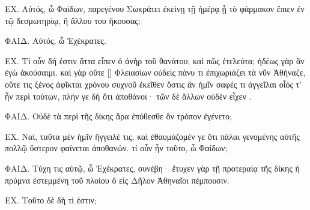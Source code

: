 \documentclass[11pt,a4paper]{book}
\begin{document}
\beginnumbering

\pstart
{}ΕΧ. Αὐτός, ὦ Φαίδων, παρεγένου Σωκράτει ἐκείνῃ τῇ ἡμέρᾳ ᾗ τὸ φάρμακον ἔπιεν ἐν τῷ δεσμωτηρίῳ, ἢ ἄλλου του ἤκουσας;

ΦΑΙΔ. Αὐτός, ὦ Ἐχέκρατες.

ΕΧ. Τί οὖν δή ἐστιν ἅττα εἶπεν ὁ ἀνὴρ  τοῦ θανάτου; καὶ πῶς ἐτελεύτα; ἡδέως γὰρ ἂν ἐγὼ ἀκούσαιμι. καὶ γὰρ οὔτε [] Φλειασίων οὐδεὶς πάνυ τι ἐπιχωριάζει τὰ νῦν Ἀθήναζε, οὔτε τις ξένος ἀφῖκται χρόνου συχνοῦ ἐκεῖθεν ὅστις ἂν ἡμῖν σαφές τι ἀγγεῖλαι οἷός τ' ἦν περὶ τούτων, πλήν γε δὴ ὅτι   ἀποθάνοι· τῶν δὲ ἄλλων οὐδὲν εἶχεν .

ΦΑΙΔ. Οὐδὲ τὰ περὶ τῆς δίκης ἄρα ἐπύθεσθε ὃν τρόπον ἐγένετο;

ΕΧ. Ναί, ταῦτα μὲν ἡμῖν ἤγγειλέ τις, καὶ ἐθαυμάζομέν γε ὅτι πάλαι γενομένης αὐτῆς πολλῷ ὕστερον φαίνεται ἀποθανών. τί οὖν ἦν τοῦτο, ὦ Φαίδων;

ΦΑΙΔ. Τύχη τις αὐτῷ, ὦ Ἐχέκρατες, συνέβη· ἔτυχεν γὰρ τῇ προτεραίᾳ τῆς δίκης ἡ πρύμνα ἐστεμμένη τοῦ πλοίου ὃ εἰς Δῆλον Ἀθηναῖοι πέμπουσιν.

ΕΧ. Τοῦτο δὲ δὴ τί ἐστιν; 
\pend

\endnumbering
\end{document}
